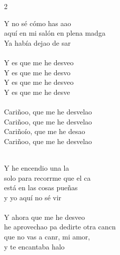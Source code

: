 \documentclass[11pt]{article}
\begin{document}
\begin{multicols*}{2}
\begin{cancion}[Desvelao][Serko]
\begin{chorus}
	Y no sé cómo has aao \\
	aquí en mi salón en plena madga\\
	Ya había dejao de sar\\
\jump\\
	Y es que me he desveo\\
	Y es que me he desvo\\
	Y es que me he desveo \\
	Y es que me he desve\\
\jump\\
	Cariñoo, que me he desvelao \\
	Cariñoo, que me he desvelao \\
	Cariñoío, que me he desao\\
	Cariñoo, que me he desvelao \\
	\end{chorus}%
	\jump\\
	Y he encendio una la \\
	solo para recorrme que el ca\\
	está en las cosas pueñas \\
	y yo aquí no sé vir \\
\jump\\
	Y ahora que me he desveo \\
	he aprovechao pa dedirte otra cancn\\
	que no vas a canr, mi amor,\\
	y te encantaba halo      \\
\end{cancion}%

\end{multicols*}
\end{document}
